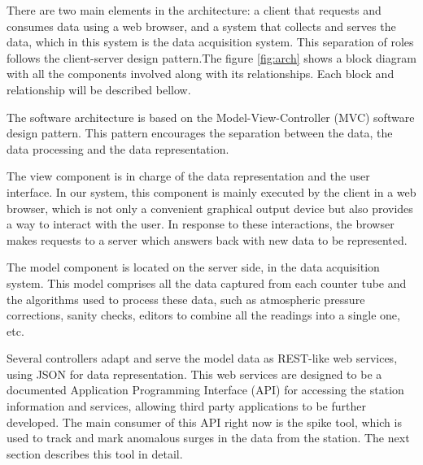 \documentclass[a4paper]{jpconf}
\begin{document}
There are two main elements in the architecture: a client that requests and
consumes data using a web browser, and a system that collects and serves the
data, which in this system is the data acquisition system. This separation of
roles follows the client-server design pattern\cite{wiki:ClientServer}.The
figure \ref{fig:arch} shows a block diagram with all the components involved
along with its relationships. Each block and relationship will be described
bellow.

The software architecture is based on the Model-View-Controller (MVC) software
design pattern\cite{wiki:MVC}. This pattern encourages the separation between
the data, the data processing and the data representation. 

The view component is in charge of the data representation and the user
interface. In our system, this component is mainly executed by the client in a
web browser, which is not only a convenient graphical output device but
also provides a way to interact with the user. In response to these
interactions, the browser makes requests to a server which answers back with new
data to be represented.

The model component is located on the server side, in the data acquisition
system. This model comprises all the data captured from each counter tube and
the algorithms used to process these data, such as atmospheric pressure
corrections, sanity checks, editors to combine all the readings into a single
one, etc.

Several controllers adapt and serve the model data as REST-like web services,
using JSON for data representation. This web services are designed to be a
documented Application Programming Interface (API) for accessing the station
information and services, allowing third party applications to be further
developed. The main consumer of this API right now is the spike tool, which is
used to track and mark anomalous surges in the data from the station. The next
section describes this tool in detail.
\end{document}
